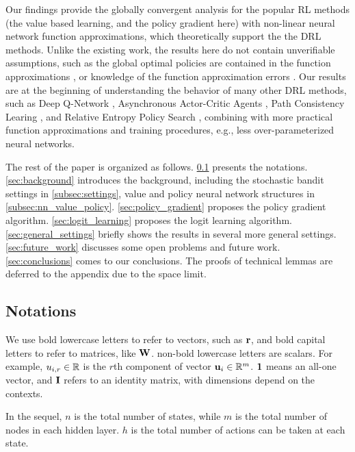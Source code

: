 Our findings provide the globally convergent analysis for the popular RL methods (the value based learning, and the policy gradient here) with non-linear neural network function approximations, which  theoretically support the  the DRL methods. Unlike the existing work, the results here do not contain unverifiable assumptions, such as the global optimal policies are contained in the function approximations \citep{krishnamurthy2016pac}, or knowledge of the function approximation errors \citep{dai2018sbeed}. Our results are at the beginning of understanding the behavior of many other DRL methods, such as Deep Q-Network \cite{mnih2015human}, Asynchronous Actor-Critic Agents \citep{mnih2016asynchronous}, Path Consistency Learing \citep{nachum2017bridging}, and Relative Entropy Policy Search \citep{peters2010relative}, combining with more practical function approximations and training procedures, e.g., less over-parameterized neural networks.

The rest of the paper is organized as follows. \cref{subsec:notations} presents the notations.   \cref{sec:background} introduces the background, including the stochastic bandit settings in  \cref{subsec:settings}, value and policy neural network structures in \cref{subsec:nn_value_policy}. \cref{sec:policy_gradient} proposes the policy gradient algorithm. \cref{sec:logit_learning} proposes the logit learning algorithm. \cref{sec:general_settings} briefly shows the results in several more general settings. \cref{sec:future_work} discusses some open problems and future work. \cref{sec:conclusions} comes to our conclusions. The proofs of technical lemmas are deferred to the appendix due to the space limit.

\subsection{Notations}
\label{subsec:notations}

We use bold lowercase letters to refer to vectors, such as ${\mathbf{r}}$, and bold capital letters to refer to matrices, like ${\mathbf{W}}$. non-bold lowercase letters are scalars. For example, $u_{i,r} \in {\mathbb{R}}$ is the $r$th component of vector ${\mathbf{u}}_i \in {\mathbb{R}}^m$. ${\mathbf{1}}$ means an all-one vector, and ${\mathbf{I}}$ refers to an identity matrix, with dimensions depend on the contexts.

In the sequel, $n$ is the total number of states, while $m$ is the total number of nodes in each hidden layer. $h$ is the total number of actions can be taken at each state.

